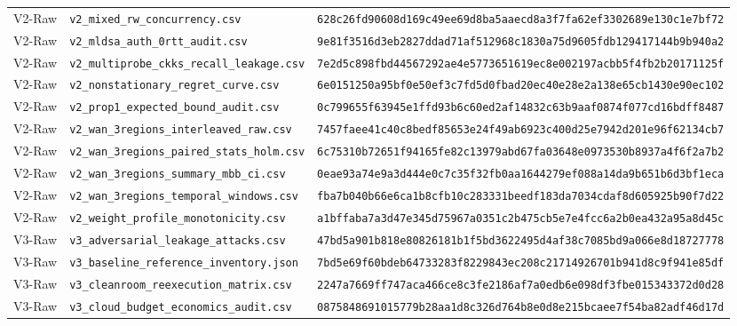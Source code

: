 \documentclass[10pt,journal,compsoc]{IEEEtran}
\begin{document}
\begin{table}[!t]
\begin{adjustbox}{max width=\textwidth}
\begin{tabular}{@{}lll@{}}
V2-Raw & \texttt{v2\_mixed\_rw\_concurrency.csv} & \texttt{\scriptsize 628c26fd90608d169c49ee69d8ba5aaecd8a3f7fa62ef3302689e130c1e7bf72} \\
V2-Raw & \texttt{v2\_mldsa\_auth\_0rtt\_audit.csv} & \texttt{\scriptsize 9e81f3516d3eb2827ddad71af512968c1830a75d9605fdb129417144b9b940a2} \\
V2-Raw & \texttt{v2\_multiprobe\_ckks\_recall\_leakage.csv} & \texttt{\scriptsize 7e2d5c898fbd44567292ae4e5773651619ec8e002197acbb5f4fb2b20171125f} \\
V2-Raw & \texttt{v2\_nonstationary\_regret\_curve.csv} & \texttt{\scriptsize 6e0151250a95bf0e50ef3c7fd5d0fbad20ec40e28e2a138e65cb1430e90ec102} \\
V2-Raw & \texttt{v2\_prop1\_expected\_bound\_audit.csv} & \texttt{\scriptsize 0c799655f63945e1ffd93b6c60ed2af14832c63b9aaf0874f077cd16bdff8487} \\
V2-Raw & \texttt{v2\_wan\_3regions\_interleaved\_raw.csv} & \texttt{\scriptsize 7457faee41c40c8bedf85653e24f49ab6923c400d25e7942d201e96f62134cb7} \\
V2-Raw & \texttt{v2\_wan\_3regions\_paired\_stats\_holm.csv} & \texttt{\scriptsize 6c75310b72651f94165fe82c13979abd67fa03648e0973530b8937a4f6f2a7b2} \\
V2-Raw & \texttt{v2\_wan\_3regions\_summary\_mbb\_ci.csv} & \texttt{\scriptsize 0eae93a74e9a3d444e0c7c35f32fb0aa1644279ef088a14da9b651b6d3bf1eca} \\
V2-Raw & \texttt{v2\_wan\_3regions\_temporal\_windows.csv} & \texttt{\scriptsize fba7b040b66e6ca1b8cfb10c283331beedf183da7034cdaf8d605925b90f7d22} \\
V2-Raw & \texttt{v2\_weight\_profile\_monotonicity.csv} & \texttt{\scriptsize a1bffaba7a3d47e345d75967a0351c2b475cb5e7e4fcc6a2b0ea432a95a8d45c} \\
V3-Raw & \texttt{v3\_adversarial\_leakage\_attacks.csv} & \texttt{\scriptsize 47bd5a901b818e80826181b1f5bd3622495d4af38c7085bd9a066e8d18727778} \\
V3-Raw & \texttt{v3\_baseline\_reference\_inventory.json} & \texttt{\scriptsize 7bd5e69f60bdeb64733283f8229843ec208c21714926701b941d8c9f941e85df} \\
V3-Raw & \texttt{v3\_cleanroom\_reexecution\_matrix.csv} & \texttt{\scriptsize 2247a7669ff747aca466ce8c3fe2186af7a0edb6e098df3fbe015343372d0d28} \\
V3-Raw & \texttt{v3\_cloud\_budget\_economics\_audit.csv} & \texttt{\scriptsize 0875848691015779b28aa1d8c326d764b8e0d8e215bcaee7f54ba82adf46d17d} \\

\end{tabular}
\end{adjustbox}
\end{table}
\end{document}
